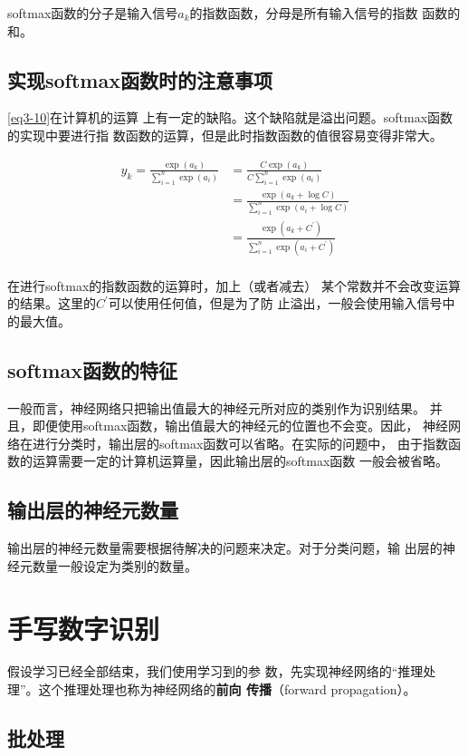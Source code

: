 softmax函数的分子是输入信号$a_k$的指数函数，分母是所有输入信号的指数
函数的和。

\subsection{实现softmax函数时的注意事项}
\autoref{eq3-10}在计算机的运算
上有一定的缺陷。这个缺陷就是溢出问题。softmax函数的实现中要进行指
数函数的运算，但是此时指数函数的值很容易变得非常大。

\begin{equation}
    \begin{aligned}
        y_k=\frac{\exp(a_k)}{\sum\limits_{i=1}^n{\exp(a_i)}} & =\frac{C\exp(a_k)}{C\sum\limits_{i=1}^n{\exp(a_i)}}             \\
                                                             & =\frac{\exp(a_k+\log C)}{\sum\limits_{i=1}^n{\exp(a_i+\log C)}} \\
                                                             & =\frac{\exp(a_k+C^{'})}{\sum\limits_{i=1}^n{\exp(a_i+C^{'})}}   \\
    \end{aligned}
\end{equation}

在进行softmax的指数函数的运算时，加上（或者减去）
某个常数并不会改变运算的结果。这里的$C^{'}$可以使用任何值，但是为了防
止溢出，一般会使用输入信号中的最大值。
\subsection{softmax函数的特征}
一般而言，神经网络只把输出值最大的神经元所对应的类别作为识别结果。
并且，即便使用softmax函数，输出值最大的神经元的位置也不会变。因此，
神经网络在进行分类时，输出层的softmax函数可以省略。在实际的问题中，
由于指数函数的运算需要一定的计算机运算量，因此输出层的softmax函数
一般会被省略。
\subsection{输出层的神经元数量}
输出层的神经元数量需要根据待解决的问题来决定。对于分类问题，输
出层的神经元数量一般设定为类别的数量。
\section{手写数字识别}
假设学习已经全部结束，我们使用学习到的参
数，先实现神经网络的“推理处理”。这个推理处理也称为神经网络的\textbf{前向
    传播}（forward propagation）。

\subsection{批处理}

